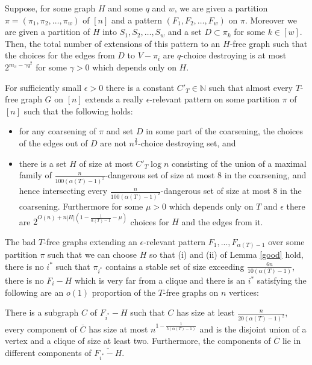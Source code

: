 \documentclass[10pt,a4paper]{amsart}
\begin{document}
\begin{lemma}\label{dangerous2cor}
Suppose, for some  graph $H$ and some $q$ and $w$,  we are given a partition $\pi=(\pi_1,\pi_2,\ldots,\pi_w)$ of $[n]$ and a pattern $(F_1,F_2,\ldots,F_w)$ on $\pi$. Moreover we are given a partition of $H$ into $S_1,S_2,\ldots, S_w$ and a set $D\subset \pi_k$ for some $k\in [w]$. 
Then, the  total number of extensions of this pattern to an $H$-free graph  such that the choices for the edges from $D$ 
to $V-\pi_i$ are $q$-choice destroying   is at most $2^{m_\pi-\gamma  q^2}$ for some $\gamma>0$ which depends only on $H$. 
\end{lemma}

\begin{corollary}\label{good}
For sufficiently small $\epsilon>0$ there is a constant $C'_T\in \mathbb{N}$ such that almost every $T$-free graph $G$ on $[n]$ extends a really $\epsilon$-relevant  pattern on some partition $\pi$ of $[n]$ such that the following holds: 
\begin{itemize}
\item [(i)]  for  any coarsening of  $\pi$ and set $D$ in some part of the coarsening,  the choices of the edges out of $D$ are not  $n^\frac{2}{3}$-choice destroying set,  and
\item [(ii)] there is a set $H$ of size  at most $C'_T \log n$ consisting of the union of   a maximal family of   $\frac{n}{100(\alpha(T)-1)^2}$-dangerous set 
of size at most 8 in the coarsening, and hence intersecting  every $\frac{n}{100(\alpha(T)-1)^2}$-dangerous set  of size at most 8 in the coarsening. Furthermore for some 
$\mu>0$ which depends only on $T$ and $\epsilon$ there are $2^{O(n)+n|H|(1-\frac{1}{\alpha(T)-1}-\mu)}$ choices for $H$ and the edges from it. 
\end{itemize}
\end{corollary}

\begin{lemma}\label{nobigstable}
The  bad $T$-free  graphs extending an $\epsilon$-relevant pattern $F_1,...,F_{\alpha(T)-1}$  over some partition $\pi$ such that we can choose $H$ so that  (i) and (ii) of Lemma \ref{good} hold,  there is no   $i^*$    such that $\pi_{i^*}$  contains  a stable set of size exceeding $ \frac{6n}{10(\alpha(T)-1)}$, there is no $F_i-H$ which is very far from a clique  
 and  there is an  $i^*$ satisfying the following are   an $o(1)$ proportion of the $T$-free graphs on $n$ vertices:
 
There is a subgraph $C$  of $F_{i^*}-H$  such that   $C$ has size at least $\frac{n}{20(\alpha(T)-1)^2}$, 
every  component of $\overline{C}$ has size  at most  $n^{1-\frac{1}{5(\alpha(T)-1)}}$  and is the disjoint union of a vertex and a clique of size at least two.
Furthermore, the components of $\overline{C}$ lie in different components of $\overline{F_{i^*}-H}$.
 \end{lemma}
\end{document}
